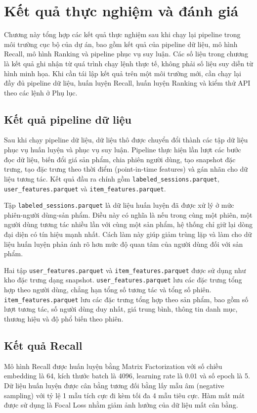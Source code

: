 ﻿\chapter{Kết quả thực nghiệm và đánh giá}

Chương này tổng hợp các kết quả thực nghiệm sau khi chạy lại pipeline trong môi trường cục bộ của dự án, bao gồm kết quả của pipeline dữ liệu, mô hình Recall, mô hình Ranking và pipeline phục vụ suy luận. Các số liệu trong chương là kết quả ghi nhận từ quá trình chạy lệnh thực tế, không phải số liệu suy diễn từ hình minh họa. Khi cần tái lập kết quả trên một môi trường mới, cần chạy lại đầy đủ pipeline dữ liệu, huấn luyện Recall, huấn luyện Ranking và kiểm thử API theo các lệnh ở Phụ lục.

\section{Kết quả pipeline dữ liệu}
Sau khi chạy pipeline dữ liệu, dữ liệu thô được chuyển đổi thành các tập dữ liệu phục vụ huấn luyện và phục vụ suy luận. Pipeline thực hiện lần lượt các bước đọc dữ liệu, biến đổi giá sản phẩm, chia phiên người dùng, tạo snapshot đặc trưng, tạo đặc trưng theo thời điểm (point-in-time features) và gán nhãn cho dữ liệu tương tác. Kết quả đầu ra chính gồm \texttt{labeled\_sessions.parquet}, \texttt{user\_features.parquet} và \texttt{item\_features.parquet}.
\medskip

Tập \texttt{labeled\_sessions.parquet} là dữ liệu huấn luyện đã được xử lý ở mức phiên-người dùng-sản phẩm. Điều này có nghĩa là nếu trong cùng một phiên, một người dùng tương tác nhiều lần với cùng một sản phẩm, hệ thống chỉ giữ lại dòng đại diện có tín hiệu mạnh nhất. Cách làm này giúp giảm trùng lặp và làm cho dữ liệu huấn luyện phản ánh rõ hơn mức độ quan tâm của người dùng đối với sản phẩm.
\medskip

Hai tập \texttt{user\_features.parquet} và \texttt{item\_features.parquet} được sử dụng như kho đặc trưng dạng snapshot. \texttt{user\_features.parquet} lưu các đặc trưng tổng hợp theo người dùng, chẳng hạn tổng số tương tác và tổng số phiên. \texttt{item\_features.parquet} lưu các đặc trưng tổng hợp theo sản phẩm, bao gồm số lượt tương tác, số người dùng duy nhất, giá trung bình, thông tin danh mục, thương hiệu và độ phổ biến theo phiên.

\section{Kết quả Recall}
Mô hình Recall được huấn luyện bằng Matrix Factorization với số chiều embedding là 64, kích thước batch là 4096, learning rate là 0.01 và số epoch là 5. Dữ liệu huấn luyện được cân bằng tương đối bằng lấy mẫu âm (negative sampling) với tỷ lệ 1 mẫu tích cực đi kèm tối đa 4 mẫu tiêu cực. Hàm mất mát được sử dụng là Focal Loss nhằm giảm ảnh hưởng của dữ liệu mất cân bằng.
\medskip

